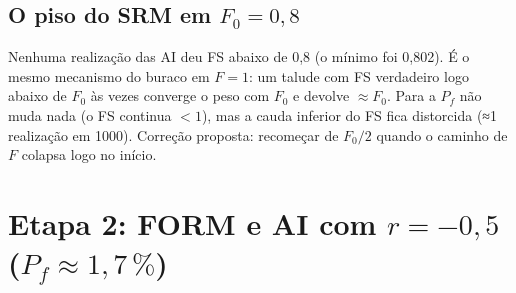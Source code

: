 \documentclass[11pt,a4paper]{article}
\begin{document}
\subsection{O piso do SRM em $F_0 = 0{,}8$}
Nenhuma realização das AI deu FS abaixo de 0,8 (o mínimo foi 0,802). É o mesmo mecanismo do buraco em $F = 1$: um talude
com FS verdadeiro logo abaixo de $F_0$ às vezes converge o peso com $F_0$ e devolve $\approx F_0$. Para a $P_f$ não muda
nada (o FS continua $< 1$), mas a cauda inferior do FS fica distorcida (≈1 realização em 1000). Correção proposta:
recomeçar de $F_0/2$ quando o caminho de $F$ colapsa logo no início.

\section{Etapa 2: FORM e AI com $r = -0{,}5$ ($P_f \approx 1{,}7\,\%$)}\label{sec:r05}
\end{document}
